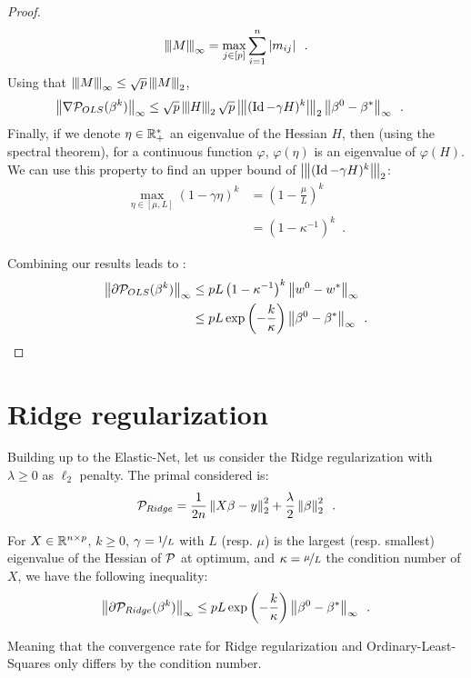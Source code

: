 \documentclass[../main.tex]{subfiles}
\begin{document}
\begin{proof}
\begin{align*}
\tnorm{M}_\infty = \max_{j\in [p]} \sum_{i=1}^n \abs{m_{ij}} \enspace.
\end{align*}
Using that $\tnorm{M}_\infty \leq \sqrt{p} \tnorm{M}_2$,
\begin{align*}
    \norm{\nabla \cP_{OLS}(\beta^k)}_\infty
    & \leq \sqrt{p}\tnorm{H}_2 \sqrt{p}\tnorm{(\Id - \gamma H)^k}_2
           \norm{\beta^0 - \beta^*}_\infty
    \enspace.
\end{align*}
Finally, if we denote $\eta\in\mathbb{R}_+^*$ an eigenvalue of the Hessian $H$, then
(using the spectral theorem),
for a continuous function $\varphi$, $\varphi(\eta)$ is an eigenvalue of
$\varphi(H)$. We can use this property to find an upper bound of
$\tnorm{(\Id - \gamma H)^k}_2$:
\begin{align*}
    \max_{\eta \in [\mu, L]}(1-\gamma \eta)^k
    & = \left(1-\frac{\mu}{L}\right)^k \\
    & = \left(1- \kappa^{-1}\right)^k
    \enspace.
\end{align*}

Combining our results leads to :
\begin{align*}
\left \lVert \partial\mathcal{P}_{OLS}(\beta^k) \right \rVert_{\infty}
& \leq p L \left(1- \kappa^{-1}\right)^k \left \lVert w^0 - w^* \right \rVert_\infty \\
& \leq pL \exp\left(-\frac{k}{\kappa}\right) \left \lVert \beta^0 - \beta^* \right \rVert_\infty
\enspace.
\end{align*}
\end{proof}

\section{Ridge regularization}
\label{sec:ridge_regularization}

Building up to the Elastic-Net, let us consider the Ridge regularization with
$\lambda\geq 0$ as $\ell_2$ penalty.
The primal considered is:
\begin{align}
    \mathcal{P}_{Ridge} = \frac{1}{2n}\left \lVert X\beta-y \right \rVert_2^2 + \frac{\lambda}{2}\left \lVert \beta \right \rVert_2^2
    \enspace.
\end{align}

\begin{proposition}\label{prop:ridge_kkt}
    For $X\in\mathbb{R}^{n\times p}$, $k\geq 0$, $\gamma = \nicefrac{1}{L}$
    with $L$ (resp. $\mu$) is the largest (resp. smallest) eigenvalue of
    the Hessian of $\mathcal{P}$ at optimum, and $\kappa=\nicefrac{\mu}{L}$ the condition
    number of $X$, we have the following inequality:
    \begin{align}
    \left \lVert \partial\mathcal{P}_{Ridge}(\beta^k) \right \rVert_{\infty}
    \leq pL \exp\left(-\frac{k}{\kappa}\right) \left \lVert \beta^0 - \beta^* \right \rVert_\infty
    \enspace.
    \end{align}
\end{proposition}
Meaning that the convergence rate for Ridge regularization and Ordinary-Least-Squares
only differs by the condition number.
\end{document}
